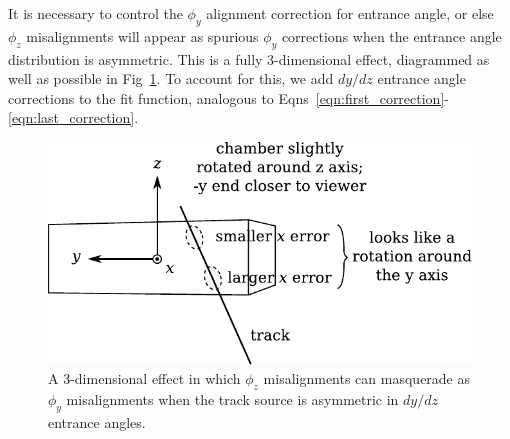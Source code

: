 \documentclass[12pt]{article}
\begin{document}
It is necessary to control the $\phi_y$ alignment correction for
entrance angle, or else $\phi_z$ misalignments will appear as spurious
$\phi_y$ corrections when the entrance angle distribution is
asymmetric.  This is a fully 3-dimensional effect, diagrammed as well
as possible in Fig~\ref{fig:motivation_for_angle_controls}.  To
account for this, we add $dy/dz$ entrance angle corrections to the fit
function, analogous to
Eqns~\ref{eqn:first_correction}-\ref{eqn:last_correction}.

\begin{figure}
\begin{center} \includegraphics[width=0.6\linewidth]{motivation_for_angle_controls.pdf} \end{center}
\caption{A 3-dimensional effect in which $\phi_z$ misalignments can masquerade as $\phi_y$ misalignments when the track source is asymmetric in $dy/dz$ entrance angles. \label{fig:motivation_for_angle_controls}}
\end{figure}
\end{document}
